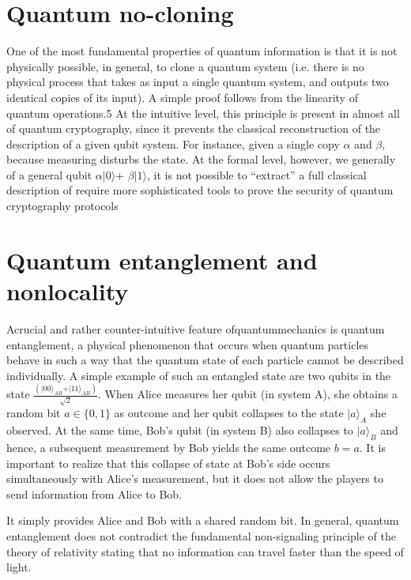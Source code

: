 \section{Quantum no-cloning}

One of the most fundamental properties of quantum information is that it is not physically possible, in general, to clone a quantum system  (i.e. there is no physical process that takes as input a single quantum system, and outputs two identical copies of its input). A simple proof follows from the linearity of quantum operations.5 At the intuitive level, this principle is present in almost all of quantum cryptography, since it prevents the classical reconstruction of the description of a given qubit system. For instance, given a single copy $\alpha$ and $\beta$, because measuring disturbs the state. At the formal level, however, we generally of a general qubit $\alpha\vert 0\rangle$+ $\beta\vert 1\rangle$, it is not possible to “extract” a full classical description of require more sophisticated tools to prove the security of quantum cryptography protocols

\section{Quantum entanglement and nonlocality}

Acrucial and rather counter-intuitive feature ofquantummechanics is quantum entanglement, a physical phenomenon that occurs when quantum particles behave in such a way that the quantum state of each particle cannot be described individually. A simple example of such an entangled state are two qubits in the state $\frac{(\vert 00\rangle_{AB} +\vert 11\rangle_{AB})}{\sqrt{2}}$. When Alice measures her
qubit (in system A), she obtains a random bit $a \in \{0, 1\}$ as outcome and her qubit collapses  to the state $\vert a\rangle_A$ she observed. At the same time, Bob’s qubit (in system B) also collapses to $\vert a\rangle_B$ and hence, a subsequent measurement by Bob yields the same outcome $b = a$. It is important to realize that this collapse of state at Bob’s side occurs simultaneously with Alice’s measurement, but it does not allow the players to send information from Alice to Bob.

It simply provides Alice and Bob with a shared random bit. In general, quantum entanglement does not contradict the fundamental non-signaling principle of the theory of relativity stating that no information can travel faster than the speed of light.


